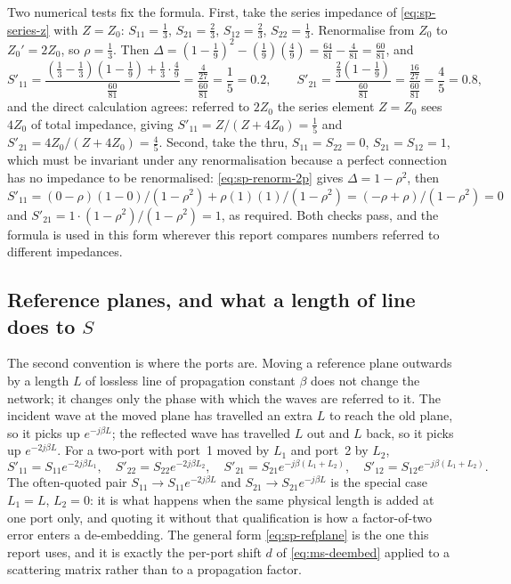 Two numerical tests fix the formula. First, take the series impedance of \eqref{eq:sp-series-z} with $Z=Z_0$:
$S_{11}=\tfrac13$, $S_{21}=\tfrac23$, $S_{12}=\tfrac23$, $S_{22}=\tfrac13$. Renormalise from $Z_0$ to $Z_0'=2Z_0$,
so $\rho=\tfrac13$. Then $\Delta=(1-\tfrac19)^2-(\tfrac19)(\tfrac49)=\tfrac{64}{81}-\tfrac{4}{81}=\tfrac{60}{81}$,
and
\begin{equation}
  S'_{11} = \frac{\left(\tfrac13-\tfrac13\right)\left(1-\tfrac19\right)+\tfrac13\cdot\tfrac49}{\tfrac{60}{81}}
          = \frac{\tfrac{4}{27}}{\tfrac{60}{81}} = \frac15 = 0.2 ,
  \qquad
  S'_{21} = \frac{\tfrac23\left(1-\tfrac19\right)}{\tfrac{60}{81}}
          = \frac{\tfrac{16}{27}}{\tfrac{60}{81}} = \frac45 = 0.8 ,
  \label{eq:sp-renorm-check}
\end{equation}
and the direct calculation agrees: referred to $2Z_0$ the series element $Z=Z_0$ sees $4Z_0$ of total
impedance, giving $S'_{11}=Z/(Z+4Z_0)=\tfrac15$ and $S'_{21}=4Z_0/(Z+4Z_0)=\tfrac45$. Second, take the thru,
$S_{11}=S_{22}=0$, $S_{21}=S_{12}=1$, which must be invariant under any renormalisation because a perfect
connection has no impedance to be renormalised: \eqref{eq:sp-renorm-2p} gives $\Delta=1-\rho^2$, then
$S'_{11}=(0-\rho)(1-0)/(1-\rho^2)+\rho(1)(1)/(1-\rho^2)=(-\rho+\rho)/(1-\rho^2)=0$ and
$S'_{21}=1\cdot(1-\rho^2)/(1-\rho^2)=1$, as required. Both checks pass, and the formula is used in this form wherever
this report compares numbers referred to different impedances.

\subsection{Reference planes, and what a length of line does to $S$}
\label{sec:sp-refplane}

The second convention is where the ports are. Moving a reference plane outwards by a length $L$ of lossless line
of propagation constant $\beta$ does not change the network; it changes only the phase with which the waves are
referred to it. The incident wave at the moved plane has travelled an extra $L$ to reach the old plane, so it
picks up $e^{-j\beta L}$; the reflected wave has travelled $L$ out and $L$ back, so it picks up $e^{-2j\beta L}$.
For a two-port with port~1 moved by $L_1$ and port~2 by $L_2$,
\begin{equation}
  S'_{11} = S_{11}e^{-2j\beta L_1}, \quad
  S'_{22} = S_{22}e^{-2j\beta L_2}, \quad
  S'_{21} = S_{21}e^{-j\beta(L_1+L_2)}, \quad
  S'_{12} = S_{12}e^{-j\beta(L_1+L_2)} .
  \label{eq:sp-refplane}
\end{equation}
The often-quoted pair $S_{11}\to S_{11}e^{-2j\beta L}$ and $S_{21}\to S_{21}e^{-j\beta L}$ is the special case
$L_1=L$, $L_2=0$: it is what happens when the same physical length is added at one port only, and quoting it
without that qualification is how a factor-of-two error enters a de-embedding. The general form
\eqref{eq:sp-refplane} is the one this report uses, and it is exactly the per-port shift $d$ of
\eqref{eq:ms-deembed} applied to a scattering matrix rather than to a propagation factor.

